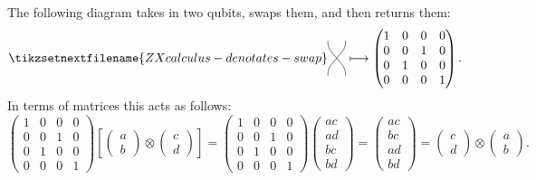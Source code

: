 \documentclass[fleqn]{NotesClass}
\begin{document}
    The following diagram takes in two qubits, swaps them, and then returns them:
    \begin{equation}
        \tikzsetnextfilename{ZXcalculus-denotates-swap}
        \begin{tikzpicture}[baseline=0.4cm]
            \draw[rounded corners] (0, 0) -- ++ (0, 0.2) -- ++ (0.5, 0.6) -- ++ (0, 0.2);
            \draw[rounded corners] (0.5, 0) -- ++ (0, 0.2) -- ++ (-0.5, 0.6) -- ++ (0, 0.2);
        \end{tikzpicture}
        \longmapsto 
        \begin{pmatrix}
            1 & 0 & 0 & 0\\
            0 & 0 & 1 & 0\\
            0 & 1 & 0 & 0\\
            0 & 0 & 0 & 1
        \end{pmatrix}
        .
    \end{equation}
    In terms of matrices this acts as follows:
    \begin{equation}
        \begin{pmatrix}
            1 & 0 & 0 & 0\\
            0 & 0 & 1 & 0\\
            0 & 1 & 0 & 0\\
            0 & 0 & 0 & 1
        \end{pmatrix}
        \left[
            \begin{pmatrix}
                a\\ b
            \end{pmatrix}
            \otimes
            \begin{pmatrix}
                c\\ d
            \end{pmatrix}
        \right]
        =
        \begin{pmatrix}
            1 & 0 & 0 & 0\\
            0 & 0 & 1 & 0\\
            0 & 1 & 0 & 0\\
            0 & 0 & 0 & 1
        \end{pmatrix}
        \begin{pmatrix}
            ac\\ ad\\ bc\\ bd
        \end{pmatrix}
        =
        \begin{pmatrix}
            ac\\ bc\\ ad\\ bd
        \end{pmatrix}
        =
        \begin{pmatrix}
            c\\ d
        \end{pmatrix}
        \otimes
        \begin{pmatrix}
            a\\ b
        \end{pmatrix}
        .
    \end{equation}
    
\end{document}
